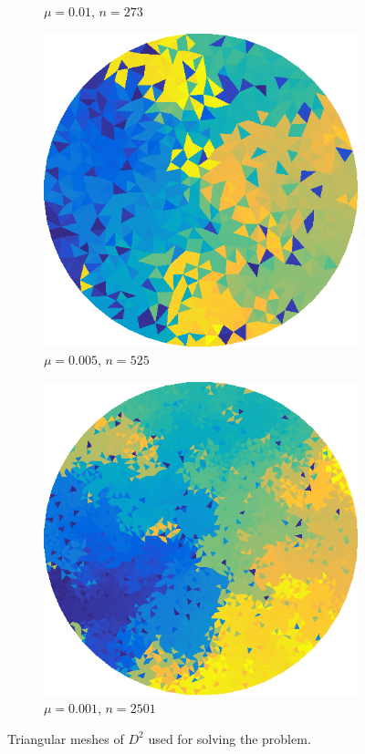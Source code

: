 \documentclass[../fem.tex]{subfile}
\begin{document}
\begin{figure}[htpb]
\begin{subfigure}{0.4\textwidth}
    \caption{$\mu=0.01$, $n=273$}
  \end{subfigure}
  \begin{subfigure}{0.4\textwidth}
    \centering
    \includegraphics[width=0.8\linewidth]{figures/c1c/tri.png}
    \caption{$\mu=0.005$, $n=525$}
  \end{subfigure}
  \begin{subfigure}{0.4\textwidth}
    \centering
    \includegraphics[width=0.8\linewidth]{figures/c1d/tri.png}
    \caption{$\mu=0.001$, $n=2501$}
  \end{subfigure}
  \caption{Triangular meshes of $D^2$ used for solving the problem.}
  \label{fig:d2_mesh}
\end{figure}
\end{document}
